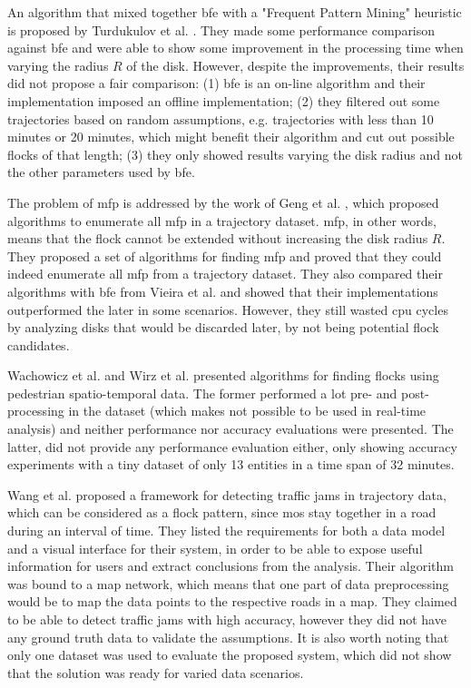 An algorithm that mixed together \ac{bfe} \citep{vieira} with a "Frequent Pattern Mining" heuristic is proposed by
Turdukulov et al. \citep{visual}. They made some performance comparison against \ac{bfe} and were able to show some
improvement in the processing time when varying the radius $R$ of the disk. However, despite the improvements, their
results did not propose a fair comparison: (1) \ac{bfe} is an on-line algorithm and their implementation imposed an
offline implementation; (2) they filtered out some trajectories based on random assumptions, e.g. trajectories with less
than 10 minutes or 20 minutes, which might benefit their algorithm and cut out possible flocks of that length; (3) they
only showed results varying the disk radius and not the other parameters used by \ac{bfe}.

The problem of \ac{mfp} is addressed by the work of Geng et al. \citep{enumeration}, which proposed algorithms to
enumerate all \ac{mfp} in a trajectory dataset. \ac{mfp}, in other words, means that the flock cannot be extended
without increasing the disk radius $R$. They proposed a set of algorithms for finding \ac{mfp} and proved that they
could indeed enumerate all \ac{mfp} from a trajectory dataset. They also compared their algorithms with \ac{bfe} from
Vieira et al. \citep{vieira} and showed that their implementations outperformed the later in some scenarios. However,
they still wasted \ac{cpu} cycles by analyzing disks that would be discarded later, by not being potential flock
candidates.

Wachowicz et al. \citep{flockpedestrian} and Wirz et al. \citep{pedestriancanyons} presented algorithms for finding
flocks using pedestrian spatio-temporal data. The former performed a lot pre- and post-processing in the dataset (which
makes not possible to be used in real-time analysis) and neither performance nor accuracy evaluations were presented.
The latter, did not provide any performance evaluation either, only showing accuracy experiments with a tiny dataset of
only 13 entities in a time span of 32 minutes.

Wang et al. \citep{visualtrafficjam} proposed a framework for detecting traffic jams in trajectory data, which can be
considered as a flock pattern, since \acp{mo} stay together in a road during an interval of time. They listed the
requirements for both a data model and a visual interface for their system, in order to be able to expose useful
information for users and extract conclusions from the analysis. Their algorithm was bound to a map network, which means
that one part of data preprocessing would be to map the data points to the respective roads in a map. They claimed to be
able to detect traffic jams with high accuracy, however they did not have any ground truth data to validate the
assumptions. It is also worth noting that only one dataset was used to evaluate the proposed system, which did not show
that the solution was ready for varied data scenarios.

